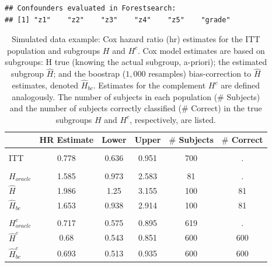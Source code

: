 \documentclass[smallextended]{svjour3}
\makeatletter
\newenvironment{kframe}{%
 \def\at@end@of@kframe{}%
 \ifinner\ifhmode%
  \def\at@end@of@kframe{\end{minipage}}%
  \begin{minipage}{\columnwidth}%
 \fi\fi%
 \def\FrameCommand##1{\hskip\@totalleftmargin \hskip-\fboxsep
 \colorbox{shadecolor}{##1}\hskip-\fboxsep
     \hskip-\linewidth \hskip-\@totalleftmargin \hskip\columnwidth}%
 \MakeFramed {\advance\hsize-\width
   \@totalleftmargin\z@ \linewidth\hsize
   \@setminipage}}%
 {\par\unskip\endMakeFramed%
 \at@end@of@kframe}
\newenvironment{knitrout}{}{} %
\makeatother
\begin{document}
\begin{knitrout}
\color{fgcolor}\begin{kframe}
\begin{verbatim}
## Confounders evaluated in Forestsearch:
## [1] "z1"    "z2"    "z3"    "z4"    "z5"    "grade"
\end{verbatim}
\end{kframe}
\end{knitrout}





\begin{table}

\caption{\label{tab:simex_tab}\label{tab:simex} Simulated data example: Cox hazard ratio (hr) estimates for the ITT population and subgroups $H$ and $H^{c}$.
Cox model estimates are based on subgroups: H true (knowing the actual subgroup, a-priori); the estimated subgroup $\hat{H}$; and 
the boostrap ($1,000$ resamples) bias-correction to $\hat{H}$ estimates, denoted $\hat{H}_{bc}$.  Estimates for the complement $H^{c}$ are defined analogously.
The number of subjects in each population ($\#$ Subjects) and the number of subjects correctly classified ($\#$ Correct) in the true subgroups $H$ and $H^{c}$, respectively, are listed.}
\centering
\fontsize{9}{11}\selectfont
\begin{tabular}[t]{lccccc}
\toprule
  & HR Estimate & Lower & Upper & $\#$ Subjects & $\#$ Correct\\
\midrule
\addlinespace[0.3em]
\multicolumn{6}{l}{\textbf{ITT}}\\
\hspace{1em}ITT & 0.778 & 0.636 & 0.951 & 700 & .\\
\addlinespace[0.3em]
\multicolumn{6}{l}{\textbf{H subgroup estimates}}\\
\hspace{1em}$H_{oracle}$ & 1.585 & 0.973 & 2.583 & 81 & .\\
\hspace{1em}$\hat{H}$ & 1.986 & 1.25 & 3.155 & 100 & 81\\
\hspace{1em}$\hat{H}_{bc}$ & 1.653 & 0.938 & 2.914 & 100 & 81\\
\addlinespace[0.3em]
\multicolumn{6}{l}{\textbf{H-complement subgroup estimates}}\\
\hspace{1em}$H^{c}_{oracle}$ & 0.717 & 0.575 & 0.895 & 619 & .\\
\hspace{1em}$\hat{H}^{c}$ & 0.68 & 0.543 & 0.851 & 600 & 600\\
\hspace{1em}$\hat{H}^{c}_{bc}$ & 0.693 & 0.513 & 0.935 & 600 & 600\\
\bottomrule
\end{tabular}
\end{table}





\end{document}
